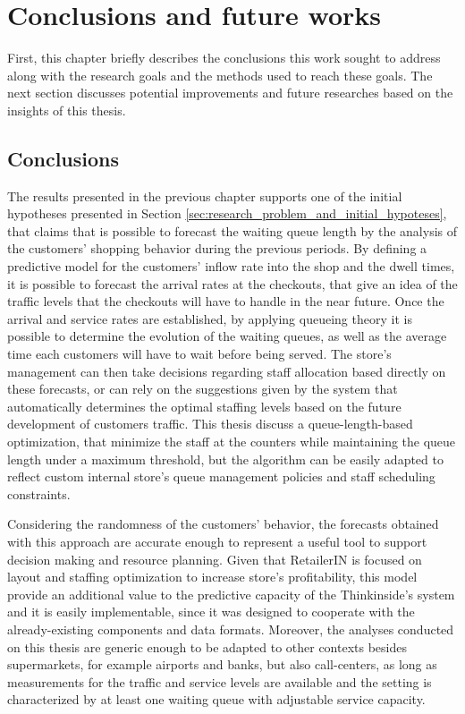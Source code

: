 \chapter{Conclusions and future works}
\label{cha:conclusions_and_future_works}

First, this chapter briefly describes the conclusions this work sought to address along with the research goals and the methods used to reach these goals. The next section discusses potential improvements and future researches based on the insights of this thesis.

\section{Conclusions}
\label{sec:conclusions}

The results presented in the previous chapter supports one of the initial hypotheses presented in Section \ref{sec:research_problem_and_initial_hypoteses}, that claims that is possible to forecast the waiting queue length by the analysis of the customers’ shopping behavior during the previous periods. By defining a predictive model for the customers’ inflow rate into the shop and the dwell times, it is possible to forecast the arrival rates at the checkouts, that give an idea of the traffic levels that the checkouts will have to handle in the near future. Once the arrival and service rates are established,  by applying queueing theory it is possible to determine the evolution of the waiting queues, as well as the average time each customers will have to wait before being served. The store’s management can then take decisions regarding staff allocation based directly on these forecasts, or can rely on the suggestions given by the system that automatically determines the optimal staffing levels based on the future development of customers traffic. This thesis discuss a queue-length-based optimization, that minimize the staff at the counters while maintaining the queue length under a maximum threshold, but the algorithm can be easily adapted to reflect custom internal store’s queue management policies and staff scheduling constraints.

Considering the randomness of the customers’ behavior, the forecasts obtained with this approach are accurate enough to represent a useful tool to support decision making and resource planning. Given that RetailerIN is focused on layout and staffing optimization to increase store’s profitability, this model provide an additional value to the predictive capacity of the Thinkinside’s system and it is easily implementable, since it was designed to cooperate with the already-existing components and data formats. Moreover, the analyses conducted on this thesis are generic enough to be adapted to other contexts besides supermarkets, for example airports and banks, but also call-centers, as long as measurements for the traffic and service levels are available and the setting is characterized by at least one waiting queue with adjustable service capacity.

